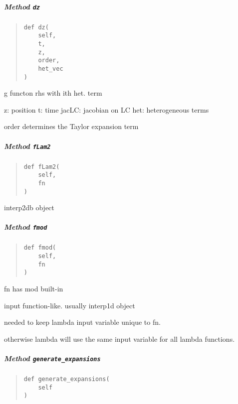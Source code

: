 \documentclass[
  english,
  a4paper,
  oneside]{article}
\begin{document}
\hypertarget{StrongCoupling.StrongCoupling.dz}{%
\subparagraph{\texorpdfstring{Method
\texttt{dz}}{Method dz}}\label{StrongCoupling.StrongCoupling.dz}}

\begin{quote}
\begin{verbatim}
def dz(
    self,
    t,
    z,
    order,
    het_vec
)
\end{verbatim}
\end{quote}

g functon rhs with ith het. term

z: position t: time jacLC: jacobian on LC het: heterogeneous terms

order determines the Taylor expansion term

\hypertarget{StrongCoupling.StrongCoupling.fLam2}{%
\subparagraph{\texorpdfstring{Method
\texttt{fLam2}}{Method fLam2}}\label{StrongCoupling.StrongCoupling.fLam2}}

\begin{quote}
\begin{verbatim}
def fLam2(
    self,
    fn
)
\end{verbatim}
\end{quote}

interp2db object

\hypertarget{StrongCoupling.StrongCoupling.fmod}{%
\subparagraph{\texorpdfstring{Method
\texttt{fmod}}{Method fmod}}\label{StrongCoupling.StrongCoupling.fmod}}

\begin{quote}
\begin{verbatim}
def fmod(
    self,
    fn
)
\end{verbatim}
\end{quote}

fn has mod built-in

input function-like. usually interp1d object

needed to keep lambda input variable unique to fn.

otherwise lambda will use the same input variable for all lambda
functions.

\hypertarget{StrongCoupling.StrongCoupling.generate_expansions}{%
\subparagraph{\texorpdfstring{Method
\texttt{generate\_expansions}}{Method generate\_expansions}}\label{StrongCoupling.StrongCoupling.generate_expansions}}

\begin{quote}
\begin{verbatim}
def generate_expansions(
    self
)
\end{verbatim}
\end{quote}
\end{document}
